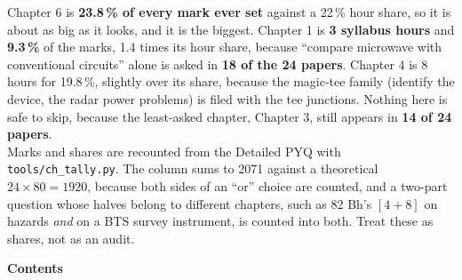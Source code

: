 \documentclass[10pt]{article}
\begin{document}
\par{}\vspace{10pt}
\begin{center}
\begin{minipage}{0.86\textwidth}\small\color{sub}
 Chapter 6 is \textbf{23.8\,\% of every
mark ever set} against a 22\,\% hour share, so it is about as big as it looks,
and it is the biggest. Chapter 1 is \textbf{3 syllabus hours} and
\textbf{9.3\,\%} of the marks, 1.4 times its hour share, because ``compare microwave with
conventional circuits'' alone is asked in \textbf{18 of the 24 papers}. Chapter 4 is 8 hours
for 19.8\,\%, slightly over its share, because the magic-tee family (identify the device,
the radar power problems) is filed with the tee junctions. Nothing here is safe to skip,
because the least-asked chapter, Chapter 3, still appears in \textbf{14 of 24 papers}.\\[6pt]
Marks and shares are recounted from the Detailed PYQ with \texttt{tools/ch\_tally.py}.
The column sums to 2071 against a theoretical $24\times80 = 1920$, because both sides of an
``or'' choice are counted, and a two-part question whose halves belong to different
chapters, such as 82 Bh's $[4+8]$ on hazards \emph{and} on a BTS survey instrument, is
counted into both. Treat these as shares, not as an audit.
\end{minipage}
\end{center}
\vspace{1.2cm}

\cleardoublepage
\pagestyle{fancy}
{\Large\bfseries\color{acc} Contents}
\vspace{-6pt}{\color{acc}\rule{\textwidth}{1.1pt}}\vspace{4pt}
\begingroup
\renewcommand{\contentsname}{}
\setcounter{tocdepth}{1}
\vspace{-24pt}
\tableofcontents
\endgroup

\cleardoublepage

\cleardoublepage

\cleardoublepage

\cleardoublepage

\cleardoublepage

\cleardoublepage

\cleardoublepage

\cleardoublepage




\cleardoublepage
{}
{}

\end{document}
